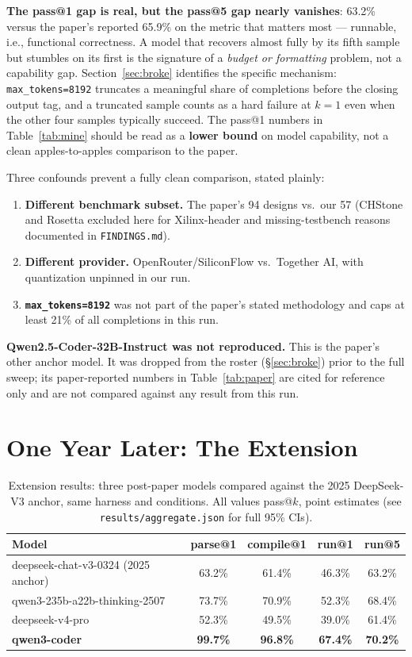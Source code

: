\documentclass[11pt]{article}
\newcommand{\code}[1]{\texttt{#1}}
\begin{document}
\textbf{The pass@1 gap is real, but the pass@5 gap nearly vanishes}:
63.2\% versus the paper's reported 65.9\% on the metric that matters
most --- runnable, i.e., functional correctness. A model that recovers
almost fully by its fifth sample but stumbles on its first is the
signature of a \emph{budget or formatting} problem, not a capability
gap. Section~\ref{sec:broke} identifies the specific mechanism:
\code{max\_tokens=8192} truncates a meaningful share of completions
before the closing output tag, and a truncated sample counts as a hard
failure at $k=1$ even when the other four samples typically succeed.
The pass@1 numbers in Table~\ref{tab:mine} should be read as a
\textbf{lower bound} on model capability, not a clean apples-to-apples
comparison to the paper.

Three confounds prevent a fully clean comparison, stated plainly:

\begin{enumerate}[leftmargin=*]
\item \textbf{Different benchmark subset.} The paper's 94 designs vs.\
our 57 (CHStone and Rosetta excluded here for Xilinx-header and
missing-testbench reasons documented in \code{FINDINGS.md}).
\item \textbf{Different provider.} OpenRouter/SiliconFlow vs.\ Together
AI, with quantization unpinned in our run.
\item \textbf{\code{max\_tokens=8192}} was not part of the paper's
stated methodology and caps at least 21\% of all completions in this
run.
\end{enumerate}

\textbf{Qwen2.5-Coder-32B-Instruct was not reproduced.} This is the
paper's other anchor model. It was dropped from the roster
(\S\ref{sec:broke}) prior to the full sweep; its paper-reported numbers
in Table~\ref{tab:paper} are cited for reference only and are not
compared against any result from this run.

\section{One Year Later: The Extension}

\begin{table}[h]
\centering
\begin{tabular}{@{}lcccc@{}}
\toprule
\textbf{Model} & \textbf{parse@1} & \textbf{compile@1} & \textbf{run@1} & \textbf{run@5} \\
\midrule
deepseek-chat-v3-0324 (2025 anchor) & 63.2\% & 61.4\% & 46.3\% & 63.2\% \\
qwen3-235b-a22b-thinking-2507 & 73.7\% & 70.9\% & 52.3\% & 68.4\% \\
deepseek-v4-pro & 52.3\% & 49.5\% & 39.0\% & 61.4\% \\
\textbf{qwen3-coder} & \textbf{99.7\%} & \textbf{96.8\%} & \textbf{67.4\%} & \textbf{70.2\%} \\
\bottomrule
\end{tabular}
\caption{Extension results: three post-paper models compared against
the 2025 DeepSeek-V3 anchor, same harness and conditions. All values
pass@$k$, point estimates (see \code{results/aggregate.json} for full
95\% CIs).}
\label{tab:extension}
\end{table}
\end{document}
